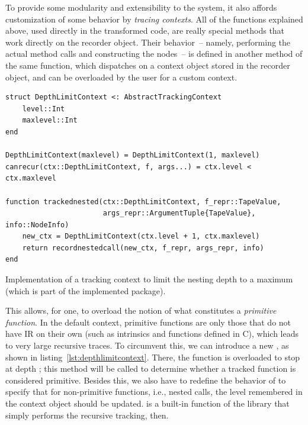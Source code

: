 To provide some modularity and extensibility to the system, it also affords customization of some
behavior by \emph{tracing contexts}.  All of the  functions explained above, used
directly in the transformed code, are really special methods that work directly on the recorder
object.  Their behavior~-- namely, performing the actual method calls and constructing the nodes~--
is defined in another method of the same function, which dispatches on a context object stored in
the recorder object, and can be overloaded by the user for a custom context.  

\begin{lstfloat}
\begin{lstlisting}[style=lstfloat]
struct DepthLimitContext <: AbstractTrackingContext
    level::Int
    maxlevel::Int
end

DepthLimitContext(maxlevel) = DepthLimitContext(1, maxlevel)
canrecur(ctx::DepthLimitContext, f, args...) = ctx.level < ctx.maxlevel

function trackednested(ctx::DepthLimitContext, f_repr::TapeValue,
                       args_repr::ArgumentTuple{TapeValue}, info::NodeInfo)
    new_ctx = DepthLimitContext(ctx.level + 1, ctx.maxlevel)
    return recordnestedcall(new_ctx, f_repr, args_repr, info)
end
\end{lstlisting}
  \caption{Implementation of a tracking context to limit the nesting depth to a maximum (which is
    part of the implemented package).\label{lst:depthlimitcontext}}
\end{lstfloat}

This allows, for one, to overload the notion of what constitutes a \emph{primitive function}.  In
the default context, primitive functions are only those that do not have IR on their own (such as
intrinsics and functions defined in C), which leads to very large recursive traces.  To circumvent
this, we can introduce a new , as shown in
listing~\ref{lst:depthlimitcontext}.  There, the function  is overloaded to stop at
depth ; this method will be called to determine whether a tracked function is
considered primitive.  Besides this, we also have to redefine the behavior of 
to specify that for non-primitive functions, i.e., nested calls, the level remembered in the context
object should be updated.   is a built-in function of the library that
simply performs the recursive tracking, then.

